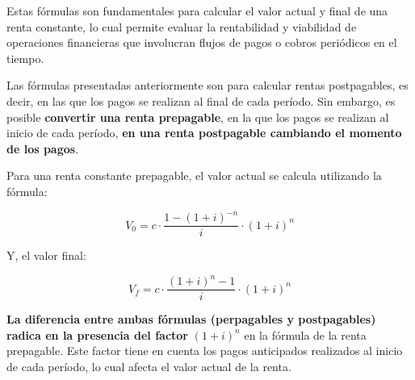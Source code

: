 \documentclass[
  letterpaper,
  DIV=11,
  numbers=noendperiod]{scrreprt}
\begin{document}
\begin{tcolorbox}
\begin{tcolorbox}[enhanced jigsaw, toprule=.15mm, left=2mm, arc=.35mm, breakable, bottomrule=.15mm, opacityback=0, rightrule=.15mm, leftrule=.75mm, colframe=quarto-callout-note-color-frame, colback=white]
\begin{minipage}[t]{\textwidth - 5.5mm}
Estas fórmulas son fundamentales para calcular el valor actual y final
de una renta constante, lo cual permite evaluar la rentabilidad y
viabilidad de operaciones financieras que involucran flujos de pagos o
cobros periódicos en el tiempo.

\end{minipage}%
\end{tcolorbox}

Las fórmulas presentadas anteriormente son para calcular rentas
postpagables, es decir, en las que los pagos se realizan al final de
cada período. Sin embargo, es posible \textbf{convertir una renta
prepagable}, en la que los pagos se realizan al inicio de cada período,
\textbf{en una renta postpagable cambiando el momento de los pagos}.

\begin{tcolorbox}[enhanced jigsaw, toprule=.15mm, left=2mm, arc=.35mm, breakable, bottomrule=.15mm, opacityback=0, rightrule=.15mm, leftrule=.75mm, colframe=quarto-callout-note-color-frame, colback=white]
\begin{minipage}[t]{5.5mm}
\textcolor{quarto-callout-note-color}{\faInfo}
\end{minipage}%
\begin{minipage}[t]{\textwidth - 5.5mm}

Para una renta constante prepagable, el valor actual se calcula
utilizando la fórmula:

\[V_0=c\cdot\frac{1-\left(1+i\right)^{-n}}{i}\cdot(1+i)^n\]

Y, el valor final:

\[V_f=c\cdot\frac{\left(1+i\right)^{n}-1}{i}\cdot(1+i)^n\]

\end{minipage}%
\end{tcolorbox}

\begin{tcolorbox}[enhanced jigsaw, toprule=.15mm, left=2mm, arc=.35mm, breakable, bottomrule=.15mm, opacityback=0, rightrule=.15mm, leftrule=.75mm, colframe=quarto-callout-warning-color-frame, colback=white]
\begin{minipage}[t]{5.5mm}
\textcolor{quarto-callout-warning-color}{\faExclamationTriangle}
\end{minipage}%
\begin{minipage}[t]{\textwidth - 5.5mm}

\textbf{La diferencia entre ambas fórmulas (perpagables y postpagables)
radica en la presencia del factor} \((1 + i)^n\) en la fórmula de la
renta prepagable. Este factor tiene en cuenta los pagos anticipados
realizados al inicio de cada período, lo cual afecta el valor actual de
la renta.


\end{minipage}
\end{tcolorbox}
\end{tcolorbox}
\end{document}

